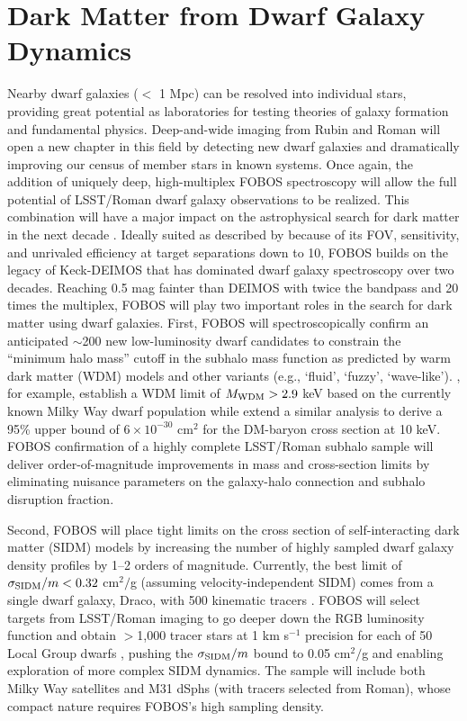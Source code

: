 \documentclass[11pt,a4paper,twoside,onecolumn,openany,final,oldfontcommands]{memoir}
\begin{document}
\section{Dark Matter from Dwarf Galaxy Dynamics}

Nearby dwarf galaxies ($<$ 1 Mpc) can be resolved into individual stars, providing great potential as laboratories for testing theories of galaxy formation and fundamental physics.  Deep-and-wide imaging from Rubin and Roman will open a new chapter in this field by detecting new dwarf galaxies and dramatically improving our census of member stars in known systems.  Once again, the addition of uniquely deep, high-multiplex FOBOS spectroscopy will allow the full potential of LSST/Roman dwarf galaxy observations to be realized.  This combination will have a major impact on the astrophysical search for dark matter in the next decade \citep{drlica-wagner19}.  Ideally suited as described by \citet{simon19} because of its FOV, sensitivity, and unrivaled efficiency at target separations down to 10\arcsec, FOBOS builds on the legacy of Keck-DEIMOS that has dominated dwarf galaxy spectroscopy over two decades.  Reaching 0.5 mag fainter than DEIMOS with twice the bandpass and 20 times the multiplex, FOBOS will play two important roles in the search for dark matter using dwarf galaxies.  First, FOBOS will spectroscopically confirm an anticipated $\sim$200 new low-luminosity dwarf candidates to constrain the ``minimum halo mass'' cutoff in the subhalo mass function as predicted by warm dark matter (WDM) models and other variants (e.g., `fluid', `fuzzy', `wave-like').  \citet{jethwa18}, for example, establish a WDM limit of $M_{\rm WDM} > 2.9$ keV based on the currently known Milky Way dwarf population while \citet{nadler19} extend a similar analysis to derive a 95\% upper bound of $6 \times 10^{-30}$ cm$^2$ for the DM-baryon cross section at 10 keV.  FOBOS confirmation of a highly complete LSST/Roman subhalo sample will deliver order-of-magnitude improvements in mass and cross-section limits by eliminating nuisance parameters on the galaxy-halo connection and subhalo disruption fraction.

Second, FOBOS will place tight limits on the cross section of self-interacting dark matter (SIDM) models by increasing the number of highly sampled dwarf galaxy density profiles by 1--2 orders of magnitude.  Currently, the best limit of $\sigma_{\rm SIDM}/m < 0.32$ cm$^2/$g (assuming velocity-independent SIDM) comes from a single dwarf galaxy, Draco, with 500 kinematic tracers \citep{read18}.  FOBOS will select targets from LSST/Roman imaging to go deeper down the RGB luminosity function and obtain $>$1,000 tracer stars at 1 km s$^{-1}$ precision for each of 50 Local Group dwarfs \citep[see][]{drlica-wagner19}, pushing the $\sigma_{\rm SIDM}/m$ bound to 0.05 cm$^2/$g and enabling exploration of more complex SIDM dynamics.  The sample will include both Milky Way satellites and M31 dSphs (with tracers selected from Roman), whose compact nature requires FOBOS's high sampling density.   
\end{document}
